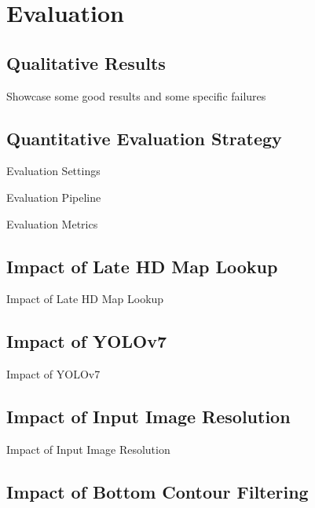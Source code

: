 
\chapter{Evaluation}
\label{ch:evaluation}

\section{Qualitative Results}
\label{sec:qualres}

Showcase some good results and some specific failures


\section{Quantitative Evaluation Strategy}
\label{sec:quant}

Evaluation Settings \par
Evaluation Pipeline \par
Evaluation Metrics


\section{Impact of Late HD Map Lookup}
\label{sec:impactlatemap}

Impact of Late HD Map Lookup


\section{Impact of YOLOv7}
\label{sec:impactyolov7}

Impact of YOLOv7


\section{Impact of Input Image Resolution}
\label{sec:impactresolution}

Impact of Input Image Resolution


\section{Impact of Bottom Contour Filtering}
\label{sec:impactcontourfiltering}

